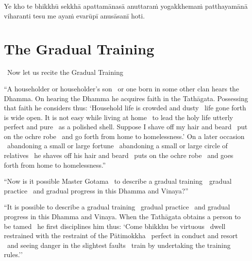 \suttaRef{[MN 39]}

Ye kho te bhikkhū sekkhā apattamānasā anuttaraṁ yogakkhemaṁ patthayamānā viharanti tesu me ayaṁ evarūpī anusāsanī hoti.

\suttaRef{[MN 107]}

\section{The Gradual Training}
\label{gradual-training}

\begin{leader-english}
  \anglebracketleft\ \hspace{-0.5mm}Now let us recite the Gradual Training \hspace{-0.5mm}\anglebracketright\
\end{leader-english}
\begin{english-only-justify}
  ``A householder or householder's son \breathmark\ or one born in some other clan hears the Dhamma. On hearing the Dhamma he acquires faith in the Tathāgata. Possessing that faith he considers thus: `Household life is crowded and dusty \breathmark\ life gone forth is wide open. It is not easy while living at home \breathmark\ to lead the holy life utterly perfect and pure \breathmark\ as a polished shell. Suppose I shave off my hair and beard \breathmark\ put on the ochre robe \breathmark\ and go forth from home to homelessness.' On a later occasion \breathmark\ abandoning a small or large fortune \breathmark\ abandoning a small or large circle of relatives \breathmark\ he shaves off his hair and beard \breathmark\ puts on the ochre robe \breathmark\ and goes forth from home to homelessness.''
\end{english-only-justify}

\suttaRef{[MN 27 / 38 / 51]}

\begin{english-only-justify}
  ``Now is it possible Master Gotama \breathmark\ to describe a gradual \mbox{training}~\breathmark\ gradual practice \breathmark\ and gradual progress in this Dhamma and Vinaya?''
\end{english-only-justify}

\begin{english-only-justify}
  ``It is possible to describe a gradual training \breathmark\ gradual practice \breathmark\ and gradual progress in this Dhamma and Vinaya. When the Tathāgata obtains a person to be tamed \breathmark\ he first disciplines him thus: `Come bhikkhu be virtuous \breathmark\ dwell restrained with the restraint of the Pātimokkha \breathmark\ perfect in conduct and resort \breathmark\ and seeing danger in the slightest faults \breathmark\ train by undertaking the training rules.''
\end{english-only-justify}

